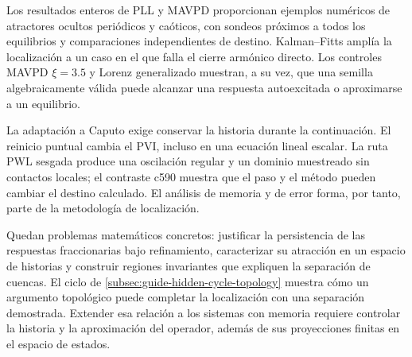 Los resultados enteros de PLL y MAVPD proporcionan ejemplos numéricos de
atractores ocultos periódicos y caóticos, con sondeos próximos a todos los
equilibrios y comparaciones independientes de destino. Kalman--Fitts amplía
la localización a un caso en el que falla el cierre armónico directo.
Los controles MAVPD \(\xi=3.5\) y Lorenz generalizado muestran, a su vez,
que una semilla algebraicamente válida puede alcanzar una respuesta
autoexcitada o aproximarse a un equilibrio.

La adaptación a Caputo exige conservar la historia durante la continuación.
El reinicio puntual cambia el PVI, incluso en una ecuación lineal escalar.
La ruta PWL sesgada produce una oscilación regular y un dominio muestreado
sin contactos locales; el contraste c590 muestra que el paso y el método
pueden cambiar el destino calculado. El análisis de memoria y de error
forma, por tanto, parte de la metodología de localización.

Quedan problemas matemáticos concretos: justificar la persistencia de las
respuestas fraccionarias bajo refinamiento, caracterizar su atracción en
un espacio de historias y construir regiones invariantes que expliquen la
separación de cuencas. El ciclo de
\cref{subsec:guide-hidden-cycle-topology} muestra cómo un argumento
topológico puede completar la localización con una separación demostrada.
Extender esa relación a los sistemas con memoria requiere controlar la
historia y la aproximación del operador, además de sus proyecciones
finitas en el espacio de estados.
